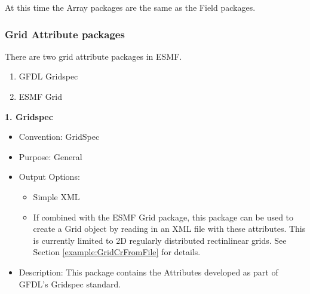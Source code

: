 At this time the Array packages are the same as the Field packages.


\vspace{.20in}
\subsubsection{Grid Attribute packages}
\label{GridAttributePackages}

There are two grid attribute packages in ESMF. 

\begin{enumerate}
    \item GFDL Gridspec
    \item ESMF Grid
\end{enumerate}



\vspace{.20in}
{\bf 1. Gridspec}

\label{CIMGridAttributePackage}

\begin{itemize}
    \item Convention: GridSpec
    \item Purpose: General
    \item Output Options:
    \begin{itemize}
        \item Simple XML
        \item If combined with the ESMF Grid package, this package can be used to create a Grid object by reading in an XML file with these attributes. This is currently limited to 2D regularly distributed rectinlinear grids. See Section \ref{example:GridCrFromFile} for details. 
    \end{itemize}
    \item Description: This package contains the Attributes developed as part of GFDL's Gridspec standard.
\end{itemize}

